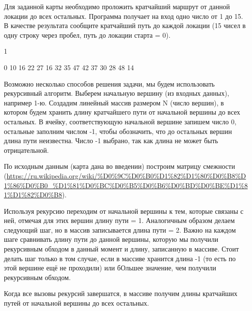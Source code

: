 Для заданной карты необходимо проложить кратчайший маршрут от данной локации до всех остальных. Программа получает на вход одно число от 1 до 15. В качестве результата сообщите кратчайший путь до каждой локации (15 чисел в одну строку через пробел, путь до локации старта = 0).

\begin{myverbbox}[\small]{\vinput}
    1
\end{myverbbox}
\begin{myverbbox}[\small]{\voutput}
    0 10 16 22 27 16 32 35 47 42 37 30 28 48 14
\end{myverbbox}

\explanationSection

Возможно несколько способов решения задачи, мы будем использовать рекурсивный алгоритм. Выберем начальную вершину (из входных данных), например 1-ю. Создадим линейный массив размером N (число вершин), в котором будем хранить длину кратчайшего пути от начальной вершины до всех остальных. В ячейку, соответствующую начальной вершине запишем число 0, остальные заполним числом -1, чтобы обозначить, что до остальных вершин длина пути неизвестна. Число -1 выбрано, так как длина не может быть отрицательной. 

По исходным данным (карта дана во введении) построим матрицу смежности (\url{https://ru.wikipedia.org/wiki/%D0%9C%D0%B0%D1%82%D1%80%D0%B8%D1%86%D0%B0_%D1%81%D0%BC%D0%B5%D0%B6%D0%BD%D0%BE%D1%81%D1%82%D0%B8}).

Используя рекурсию переходим от начальной вершины к тем, которые связаны с ней, отмечая для этих вершин длину пути = 1. Аналогичным образом делаем следующий шаг, но в массив записывается длина пути = 2. Важно на каждом шаге сравнивать длину пути до данной вершины, которую мы получили рекурсивным обходом в данный момент и длину, записанную в массиве. Стоит делать шаг только в том случае, если в массиве хранится длина -1 (то есть по этой вершине ещё не проходили) или бОльшее значение, чем получили рекурсивным обходом.

Когда все вызовы рекурсий завершатся, в массиве получим длины кратчайших путей от начальной вершины до всех остальных.